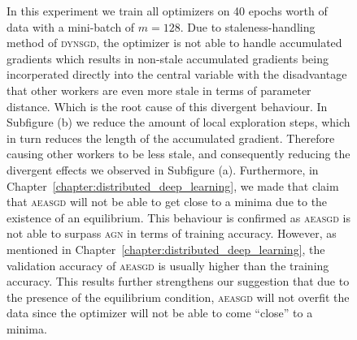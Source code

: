 \begin{figure}[H]
  \caption{In this experiment we train all optimizers on 40 epochs worth of data with a mini-batch of $m = 128$. Due to staleness-handling method of \textsc{dynsgd}, the optimizer is not able to handle accumulated gradients which results in non-stale accumulated gradients being incorperated directly into the central variable with the disadvantage that other workers are even more stale in terms of parameter distance. Which is the root cause of this divergent behaviour. In Subfigure (b) we reduce the amount of local exploration steps, which in turn reduces the length of the accumulated gradient. Therefore causing other workers to be less stale, and consequently reducing the divergent effects we observed in Subfigure (a). Furthermore, in Chapter~\ref{chapter:distributed_deep_learning}, we made that claim that \textsc{aeasgd} will not be able to get close to a minima due to the existence of an equilibrium. This behaviour is confirmed as \textsc{aeasgd} is not able to surpass \textsc{agn} in terms of training accuracy. However, as mentioned in Chapter~\ref{chapter:distributed_deep_learning}, the validation accuracy of \textsc{aeasgd} is usually higher than the training accuracy. This results further strengthens our suggestion that due to the presence of the equilibrium condition, \textsc{aeasgd} will not overfit the data since the optimizer will not be able to come ``close'' to a minima.}
  \label{fig:agn_experiment_1}
\end{figure}

